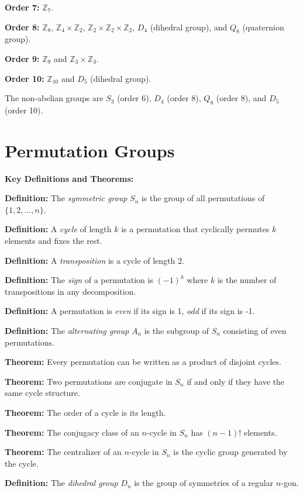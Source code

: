 \textbf{Order 7:} $\mathbb{Z}_7$.

\textbf{Order 8:} $\mathbb{Z}_8$, $\mathbb{Z}_4 \times \mathbb{Z}_2$, $\mathbb{Z}_2 \times \mathbb{Z}_2 \times \mathbb{Z}_2$, $D_4$ (dihedral group), and $Q_8$ (quaternion group).

\textbf{Order 9:} $\mathbb{Z}_9$ and $\mathbb{Z}_3 \times \mathbb{Z}_3$.

\textbf{Order 10:} $\mathbb{Z}_{10}$ and $D_5$ (dihedral group).

The non-abelian groups are $S_3$ (order 6), $D_4$ (order 8), $Q_8$ (order 8), and $D_5$ (order 10).

\section{Permutation Groups}

\textbf{Key Definitions and Theorems:}

\textbf{Definition:} The \textit{symmetric group} $S_n$ is the group of all permutations of $\{1, 2, \ldots, n\}$.

\textbf{Definition:} A \textit{cycle} of length $k$ is a permutation that cyclically permutes $k$ elements and fixes the rest.

\textbf{Definition:} A \textit{transposition} is a cycle of length 2.

\textbf{Definition:} The \textit{sign} of a permutation is $(-1)^k$ where $k$ is the number of transpositions in any decomposition.

\textbf{Definition:} A permutation is \textit{even} if its sign is 1, \textit{odd} if its sign is -1.

\textbf{Definition:} The \textit{alternating group} $A_n$ is the subgroup of $S_n$ consisting of even permutations.

\textbf{Theorem:} Every permutation can be written as a product of disjoint cycles.

\textbf{Theorem:} Two permutations are conjugate in $S_n$ if and only if they have the same cycle structure.

\textbf{Theorem:} The order of a cycle is its length.

\textbf{Theorem:} The conjugacy class of an $n$-cycle in $S_n$ has $(n-1)!$ elements.

\textbf{Theorem:} The centralizer of an $n$-cycle in $S_n$ is the cyclic group generated by the cycle.

\textbf{Definition:} The \textit{dihedral group} $D_n$ is the group of symmetries of a regular $n$-gon.

